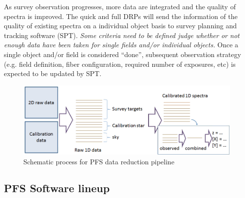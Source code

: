 \documentclass[a4paper,notitlepage]{article}
\begin{document}
As survey observation progresses, more data are integrated and the
quality of spectra is improved. The quick and full DRPs will send the
information of the quality of existing spectra on a individual object
basis to survey planning and tracking software (SPT). {\it Some criteria
need to be defined judge whether or not enough data have been taken for
single fields and/or individual objects.} Once a single object and/or
field is considered ``done'', subsequent observation strategy
(e.g. field definition, fiber configuration, required number of
exposures, etc) is expected to be updated by SPT.

\begin{figure}[htb]
  \begin{center}
    \includegraphics[width=.75\linewidth]{sciops-scireq-drp-slide.png}
  \end{center}
  \caption{Schematic process for PFS data reduction pipeline}
  \label{fig:sciops-scireq-drp-slide}
\end{figure}

\subsection{PFS Software lineup}
\end{document}
